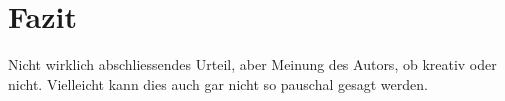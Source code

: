 \chapter{Fazit}
Nicht wirklich abschliessendes Urteil, aber Meinung des Autors, ob kreativ oder nicht. Vielleicht kann dies auch gar
nicht so pauschal gesagt werden.